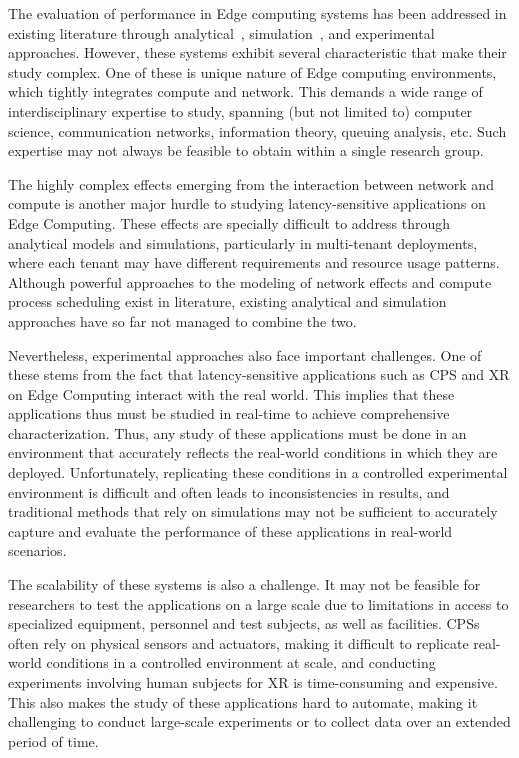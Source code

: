 The evaluation of performance in Edge computing systems has been addressed in existing literature through analytical~\cite{chen2015efficient,champati2015one,champati2016semi,al2017reliable}, simulation~\cite{svorobej2019simulating,gupta2017ifogsim,sonmez2018edgecloudsim,qayyum2018fognetsimpp}, and experimental~\cite{das2018edgebench,lee2019iotbench,george2020openrtist,mcchesney2019defog,baurle2022comb} approaches.
However, these systems exhibit several characteristic that make their study complex.
One of these is unique nature of Edge computing environments, which tightly integrates compute and network.
This demands a wide range of interdisciplinary expertise to study, spanning (but not limited to) computer science, communication networks, information theory, queuing analysis, etc.
Such expertise may not always be feasible to obtain within a single research group.

The highly complex effects emerging from the interaction between network and compute is another major hurdle to studying latency-sensitive applications on Edge Computing.
These effects are specially difficult to address through analytical models and simulations, particularly in multi-tenant deployments, where each tenant may have different requirements and resource usage patterns.
Although powerful approaches to the modeling of network effects and compute process scheduling exist in literature, existing analytical and simulation approaches have so far not managed to combine the two.

Nevertheless, experimental approaches also face important challenges.
One of these stems from the fact that latency-sensitive applications such as \gls{CPS} and \gls{XR} on Edge Computing interact with the real world.
This implies that these applications thus must be studied in real-time to achieve comprehensive characterization.
Thus, any study of these applications must be done in an environment that accurately reflects the real-world conditions in which they are deployed.
Unfortunately, replicating these conditions in a controlled experimental environment is difficult and often leads to inconsistencies in results, and traditional methods that rely on simulations may not be sufficient to accurately capture and evaluate the performance of these applications in real-world scenarios.

The scalability of these systems is also a challenge.
It may not be feasible for researchers to test the applications on a large scale due to limitations in access to specialized equipment, personnel and test subjects, as well as facilities.
\glspl{CPS} often rely on physical sensors and actuators, making it difficult to replicate real-world conditions in a controlled environment at scale, and conducting experiments involving human subjects for \gls{XR} is time-consuming and expensive.
This also makes the study of these applications hard to automate, making it challenging to conduct large-scale experiments or to collect data over an extended period of time.

